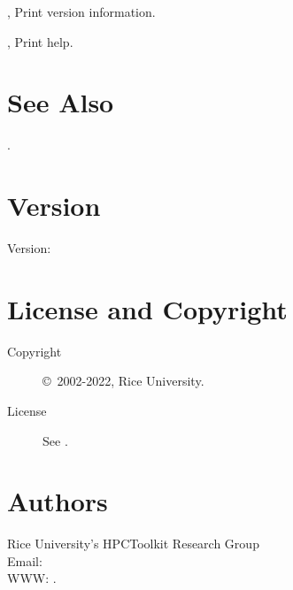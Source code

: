 \documentclass[english]{article}
\begin{document}
\begin{Description}
\item[\Opt{-V}, \Opt{--version}] Print version information.
\item[\Opt{-h}, \Opt{--help}] Print help.
\end{Description}


\section{See Also}

.

\section{Version}

Version: \Version

\section{License and Copyright}

\begin{description}
\item[Copyright] \copyright\ 2002-2022, Rice University.
\item[License] See .
\end{description}

\section{Authors}

\noindent
Rice University's HPCToolkit Research Group \\
Email:  \\
WWW: .

\LatexManEnd
\end{document}
